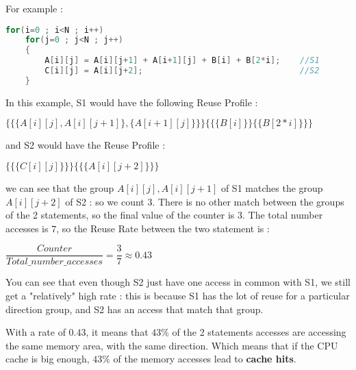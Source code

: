 \documentclass[paper=a4, fontsize=11.5pt]{scrartcl}
\numberwithin{equation}{section}        %
\numberwithin{figure}{section}          %
\numberwithin{table}{section}               %
\begin{document}
            For example :
\begin{lstlisting}[frame=single, language=C, caption={Reuse profile rating example}, label={lst:rp_example}]
for(i=0 ; i<N ; i++)
    for(j=0 ; j<N ; j++)
    {
        A[i][j] = A[i][j+1] + A[i+1][j] + B[i] + B[2*i];    //S1
        C[i][j] = A[i][j+2];                                //S2
    }
\end{lstlisting}
        In this example, S1 would have the following Reuse Profile :
        \begin{center}$
            \{
                \{ 
                    \{A[i][j],A[i][j+1]\},
                    \{A[i+1][j]\}
                \}
            \}
            \{
                \{
                    \{B[i]\}
                \}
                \{
                    \{B[2*i]\}
                \}
            \}$
        \end{center}
            and S2 would have the Reuse Profile :
        \begin{center}$
            \{
                \{
                    \{C[i][j]\}
                \}
            \}
            \{
                \{
                    \{A[i][j+2]\}
                \}
            \}$
        \end{center}
        we can see that the group ${A[i][j],A[i][j+1]}$ of S1 matches the group ${A[i][j+2]}$
        of S2 : so we count $3$. There is no other match between the groups of the 2 statements,
        so the final value of the counter is $3$. The total number accesses is $7$, so the
        Reuse Rate between the two statement is :
        \begin{center}
            $\dfrac{\mathit{Counter}}{\mathit{Total\_number\_accesses}} = \dfrac{3}{7} \approx 0.43$
        \end{center}

        \bigskip

        You can see that even though S2 just have one access in common with S1, we still get
        a "relatively" high rate : this is because S1 has the lot of reuse for a particular
        direction group, and S2 has an access that match that group.

        With a rate of $0.43$, it means that $43\%$ of the 2 statements accesses are
        accessing the same memory area, with the same direction. Which means that if the
        CPU cache is big enough, $43\%$ of the memory accesses lead to \textbf{cache hits}.
            
\end{document}
